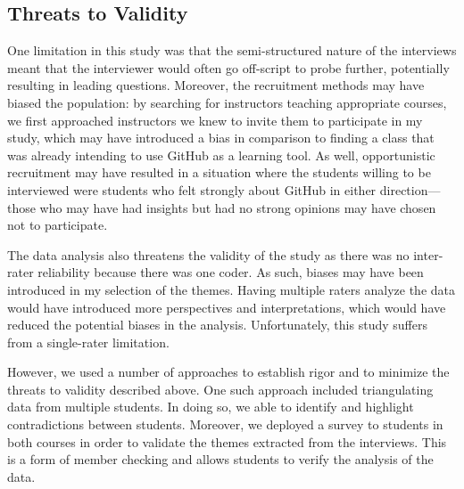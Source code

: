 \subsection{Threats to Validity}
One limitation in this study was that the semi-structured nature of the interviews meant that the interviewer would often go off-script to probe further, potentially resulting in leading questions. Moreover, the recruitment methods may have biased the population: by searching for instructors teaching appropriate courses, we first approached instructors we knew to invite them to participate in my study, which may have introduced a bias in comparison to finding a class that was already intending to use GitHub as a learning tool. As well, opportunistic recruitment may have resulted in a situation where the students willing to be interviewed were students who felt strongly about GitHub in either direction---those who may have had insights but had no strong opinions may have chosen not to participate.

The data analysis also threatens the validity of the study as there was no inter-rater reliability because there was one coder. As such, biases may have been introduced in my selection of the themes. Having multiple raters analyze the data would have introduced more perspectives and interpretations, which would have reduced the potential biases in the analysis. Unfortunately, this study suffers from a single-rater limitation.

However, we used a number of approaches\cite{runeson2012case} to establish rigor and to minimize the threats to validity described above. One such approach included triangulating data from multiple students. In doing so, we able to identify and highlight contradictions between students. Moreover, we deployed a survey to students in both courses in order to validate the themes extracted from the interviews. This is a form of member checking and allows students to verify the analysis of the data. %


